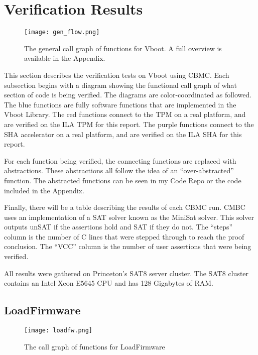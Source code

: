 \chapter{Verification Results}\label{sec:VerifResults}

 \begin{figure}[!htbp]
   \centering
   \texttt{[image: gen\_flow.png]}
   \caption[Vboot General Call Graph]{The general call graph of functions for Vboot. A full overview is available in the Appendix.}\label{fig:allflow}
 \end{figure}

This section describes the verification tests on Vboot using CBMC\@.
Each subsection begins with a diagram showing the functional call graph of what section of code is being verified.
The diagrams are color-coordinated as followed.
The blue functions are fully software functions that are implemented in the Vboot Library.
The red functions connect to the TPM on a real platform, and are verified on the
ILA TPM for this report.
The purple functions connect to the SHA accelerator on a real platform, and 
are verified on the ILA SHA for this report.

For each function being verified, the connecting functions are replaced with
abstractions.
These abstractions all follow the idea of an ``over-abstracted'' function.
The abstracted functions can be seen in my Code Repo or the code included in the
Appendix.

Finally, there will be a table describing the results of each CBMC run.
CMBC uses an implementation of a SAT solver known as the MiniSat solver\cite{minisat}.
This solver outputs unSAT if the assertions hold and SAT if they do not. 
The ``steps'' column is the number of C lines that were stepped through to reach the proof conclusion.
The ``VCC'' column is the number of user assertions that were being verified.

All results were gathered on Princeton's SAT8 server cluster. 
The SAT8 cluster contains an Intel Xeon E5645 CPU and has 128 Gigabytes of RAM.

\section{LoadFirmware}

\begin{figure}[!htbp]
  \centering
  \texttt{[image: loadfw.png]}
  \caption[LoadFirmware Call Graph]{The call graph of functions for LoadFirmware}\label{fig:loadfw}
\end{figure}

